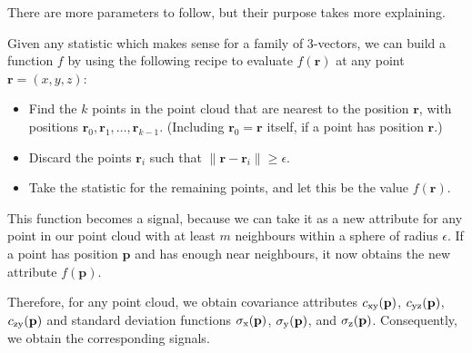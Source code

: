 \documentclass[a4paper,11pt,twoside]{article}
\theoremstyle{definition}
\theoremstyle{remark}
\newcommand{\x}{\mathrm{x}}
\newcommand{\y}{\mathrm{y}}
\newcommand{\z}{\mathrm{z}}
\begin{document}
There are more parameters to follow, but their purpose takes more explaining.

Given any statistic which makes sense for a family of 3-vectors, we can build a function $f$ by using the following recipe to evaluate $f(\textbf{r})$ at any point $\textbf{r}=(x,y,z)$:
\begin{itemize}
\item Find the $k$ points in the point cloud that are nearest to the position $\textbf{r}$, with positions $\textbf{r}_0,\textbf{r}_1,\dots,\textbf{r}_{k-1}$. (Including $\textbf{r}_0=\textbf{r}$ itself, if a point has position $\textbf{r}$.)
\item Discard the points $\textbf{r}_i$ such that $\lVert \textbf{r}-\textbf{r}_i\rVert\geqslant\epsilon$.
\item Take the statistic for the remaining points, and let this be the value $f(\textbf{r})$.
\end{itemize}
This function becomes a signal, because we can take it as a new attribute for any point in our point cloud with at least $m$ neighbours within a sphere of radius $\epsilon$. If a point has position $\textbf{p}$ and has enough near neighbours, it now obtains the new attribute $f(\textbf{p})$.

Therefore, for any point cloud, we obtain covariance attributes $c_{\x\y}(\textbf p)$, $c_{\y\z}(\textbf p)$, $c_{\z\y}(\textbf p)$ and standard deviation functions $\sigma_\x(\textbf p)$, $\sigma_\y(\textbf p)$, and $\sigma_\z(\textbf p)$. Consequently, we obtain the corresponding signals.
\end{document}
